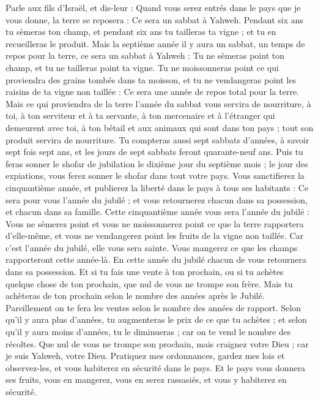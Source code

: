 \begin{multicols}{2}
Parle aux fils d'Israël, et dis-leur : Quand vous serez entrés dans le pays que je vous donne, la terre se reposera : Ce sera un sabbat à Yahweh.
Pendant six ans tu sèmeras ton champ, et pendant six ans tu tailleras ta vigne ; et tu en recueilleras le produit.
Mais la septième année il y aura un sabbat, un temps de repos pour la terre, ce sera un sabbat à Yahweh : Tu ne sèmeras point ton champ, et tu ne tailleras point ta vigne.
Tu ne moissonneras point ce qui proviendra des grains tombés dans ta moisson, et tu ne vendangeras point les raisins de ta vigne non taillée : Ce sera une année de repos total pour la terre.
Mais ce qui proviendra de la terre l'année du sabbat vous servira de nourriture, à toi, à ton serviteur et à ta servante, à ton mercenaire et à l’étranger qui demeurent avec toi,
à ton bétail et aux animaux qui sont dans ton pays ; tout son produit servira de nourriture.
Tu compteras aussi sept sabbats d'années, à savoir sept fois sept ans, et les jours de sept sabbats feront quarante-neuf ans.
Puis tu feras sonner le shofar de jubilation le dixième jour du septième mois ; le jour des expiations, vous ferez sonner le shofar dans tout votre pays.
Vous sanctifierez la cinquantième année, et publierez la liberté dans le pays à tous ses habitants : Ce sera pour vous l'année du jubilé ; et vous retournerez chacun dans sa possession, et chacun dans sa famille.
Cette cinquantième année vous sera l'année du jubilé : Vous ne sèmerez point et vous ne moissonnerez point ce que la terre rapportera d'elle-même, et vous ne vendangerez point les fruits de la vigne non taillée.
Car c'est l'année du jubilé, elle vous sera sainte. Vous mangerez ce que les champs rapporteront cette année-là.
En cette année du jubilé chacun de vous retournera dans sa possession.
Et si tu fais une vente à ton prochain, ou si tu achètes quelque chose de ton prochain, que nul de vous ne trompe son frère.
Mais tu achèteras de ton prochain selon le nombre des années après le Jubilé. Pareillement on te fera les ventes selon le nombre des années de rapport.
Selon qu'il y aura plus d'années, tu augmenteras le prix de ce que tu achètes ; et selon qu'il y aura moins d'années, tu le diminueras ; car on te vend le nombre des récoltes.
Que nul de vous ne trompe son prochain, mais craignez votre Dieu ; car je suis Yahweh, votre Dieu.
Pratiquez mes ordonnances, gardez mes lois et observez-les, et vous habiterez en sécurité dans le pays.
Et le pays vous donnera ses fruits, vous en mangerez, vous en serez rassasiés, et vous y habiterez en sécurité.

\end{multicols}
